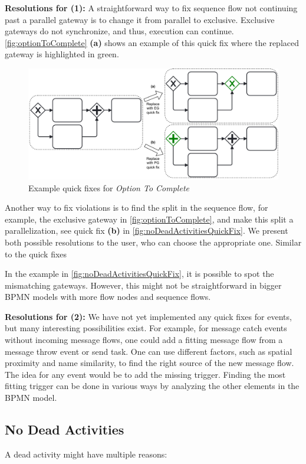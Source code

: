 \documentclass[runningheads]{llncs}
\begin{document}
\textbf{Resolutions for (1):} A straightforward way to fix sequence flow not continuing past a parallel gateway is to change it from parallel to exclusive.
Exclusive gateways do not synchronize, and thus, execution can continue.
\autoref{fig:optionToComplete} \textbf{(a)} shows an example of this quick fix where the replaced gateway is highlighted in green.

\begin{figure}[ht]
	\centering
	\includegraphics[width=1\textwidth]{images/optionToComplete}
	\caption{Example quick fixes for \textit{Option To Complete}}
	\label{fig:optionToComplete}
\end{figure}

Another way to fix violations is to find the split in the sequence flow, for example, the exclusive gateway in \autoref{fig:optionToComplete}, and make this split a parallelization, see quick fix \textbf{(b)} in \autoref{fig:noDeadActivitiesQuickFix}.
We present both possible resolutions to the user, who can choose the appropriate one.
Similar to the quick fixes 

In the example in \autoref{fig:noDeadActivitiesQuickFix}, it is possible to spot the mismatching gateways.
However, this might not be straightforward in bigger BPMN models with more flow nodes and sequence flows.

\textbf{Resolutions for (2):} We have not yet implemented any quick fixes for events, but many interesting possibilities exist.
For example, for message catch events without incoming message flows, one could add a fitting message flow from a message throw event or send task.
One can use different factors, such as spatial proximity and name similarity, to find the right source of the new message flow.
The idea for any event would be to add the missing trigger.
Finding the most fitting trigger can be done in various ways by analyzing the other elements in the BPMN model.


\subsection{No Dead Activities}
A dead activity might have multiple reasons:
\end{document}
